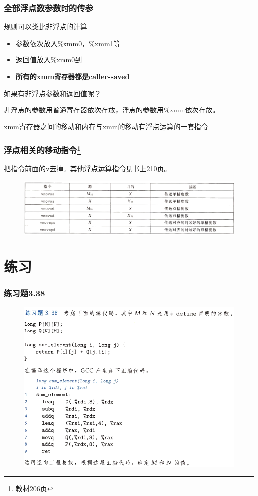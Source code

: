 \documentclass[12pt,AutoFakeBold,aspectratio=169,mathserif]{beamer}
\begin{document}
    \begin{frame}
        \frametitle{全部浮点数参数时的传参}
    
        规则可以类比非浮点的计算
        \begin{itemize}
            \item 参数依次放入\%xmm0，\%xmm1等
            \item 返回值放入\%xmm0到
            \item \textbf{所有的xmm寄存器都是caller-saved}
        \end{itemize}

        如果有非浮点参数和返回值呢？
        \pause

        非浮点的参数用普通寄存器依次存放，浮点的参数用\%xmm依次存放。

        xmm寄存器之间的移动和内存与xmm的移动有浮点运算的一套指令
    
    \end{frame}

    \begin{frame}
        \frametitle{浮点相关的移动指令\footnote{教材206页}}
    
        把指令前面的v去掉。其他浮点运算指令见书上210页。
        \begin{figure}
            \includegraphics[width=\textwidth]{figures/vmov.png}
        \end{figure}
    
    \end{frame}

    \section{练习}

    \begin{frame}
        \frametitle{练习题3.38}
    
        \begin{figure}
            \includegraphics[width=.7\textwidth]{figures/338.png}
        \end{figure}
    
    \end{frame}
\end{document}
